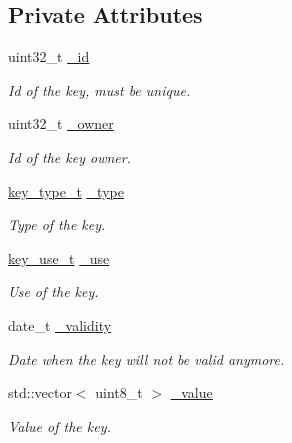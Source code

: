 \subsection*{Private Attributes}
\begin{DoxyCompactItemize}
\item 
\hypertarget{classKey_a24b72a6567dcfe21d7e3e26394ddbd63}{}uint32\+\_\+t \hyperlink{classKey_a24b72a6567dcfe21d7e3e26394ddbd63}{\+\_\+id}\label{classKey_a24b72a6567dcfe21d7e3e26394ddbd63}

\begin{DoxyCompactList}\small\item\em Id of the key, must be unique. \end{DoxyCompactList}\item 
\hypertarget{classKey_aeb08ff8b20a2b8cea5e365349a60cca2}{}uint32\+\_\+t \hyperlink{classKey_aeb08ff8b20a2b8cea5e365349a60cca2}{\+\_\+owner}\label{classKey_aeb08ff8b20a2b8cea5e365349a60cca2}

\begin{DoxyCompactList}\small\item\em Id of the key owner. \end{DoxyCompactList}\item 
\hypertarget{classKey_a9a49d8de8d81482db0e5deded871bf16}{}\hyperlink{key_8hpp_a4f367c350737c92475175fb229c5570e}{key\+\_\+type\+\_\+t} \hyperlink{classKey_a9a49d8de8d81482db0e5deded871bf16}{\+\_\+type}\label{classKey_a9a49d8de8d81482db0e5deded871bf16}

\begin{DoxyCompactList}\small\item\em Type of the key. \end{DoxyCompactList}\item 
\hypertarget{classKey_a605d565576cb518072992ef854349cbf}{}\hyperlink{key_8hpp_a82f88f5cef6b287c45bd2fbb36879c3e}{key\+\_\+use\+\_\+t} \hyperlink{classKey_a605d565576cb518072992ef854349cbf}{\+\_\+use}\label{classKey_a605d565576cb518072992ef854349cbf}

\begin{DoxyCompactList}\small\item\em Use of the key. \end{DoxyCompactList}\item 
\hypertarget{classKey_af1cec132c6d89dcdc46fbf53c1a3d4b7}{}date\+\_\+t \hyperlink{classKey_af1cec132c6d89dcdc46fbf53c1a3d4b7}{\+\_\+validity}\label{classKey_af1cec132c6d89dcdc46fbf53c1a3d4b7}

\begin{DoxyCompactList}\small\item\em Date when the key will not be valid anymore. \end{DoxyCompactList}\item 
\hypertarget{classKey_a8084600fd511cc793d5a1376164e4713}{}std\+::vector$<$ uint8\+\_\+t $>$ \hyperlink{classKey_a8084600fd511cc793d5a1376164e4713}{\+\_\+value}\label{classKey_a8084600fd511cc793d5a1376164e4713}

\begin{DoxyCompactList}\small\item\em Value of the key. \end{DoxyCompactList}\end{DoxyCompactItemize}
